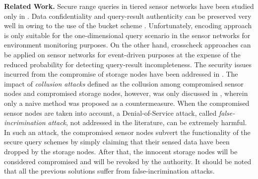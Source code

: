 \documentclass[conference]{IEEEtran}
\begin{document}
\textbf{Related Work.} Secure range queries in tiered sensor networks have been studied only in \cite{sl08,szz09,zsz09}. Data confidentiality and query-result authenticity can be preserved very well in \cite{sl08,szz09,zsz09} owing to the use of the bucket scheme \cite{hilm02,hmt04}. Unfortunately, encoding approach \cite{sl08} is only suitable for the one-dimensional query scenario in the sensor networks for environment monitoring purposes. On the other hand, crosscheck approaches \cite{szz09,zsz09} can be applied on sensor networks for event-driven purposes at the expense of the reduced probability for detecting query-result incompleteness. The security issues incurred from the compromise of storage nodes have been addressed in \cite{sl08,szz09,zsz09}. The impact of \emph{collusion attacks} defined as the collusion among compromised sensor nodes and compromised storage nodes, however, was only discussed in \cite{zsz09}, wherein only a naive method was proposed as a countermeasure. When the compromised sensor nodes are taken into account, a Denial-of-Service attack, called \emph{false-incrimination attack}, not addressed in the literature, can be extremely harmful. In such an attack, the compromised sensor nodes subvert the functionality of the secure query schemes by simply claiming that their sensed data have been dropped by the storage nodes. After that, the innocent storage nodes will be considered compromised and will be revoked by the authority. It should be noted that all the previous solutions suffer from false-incrimination attacks.
\end{document}
